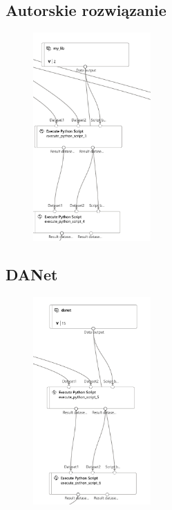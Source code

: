 \subsection{Autorskie rozwiązanie}
\begin{figure}[H]
    \centering
    \includegraphics[width=0.4\textwidth]{images/ga_pipe}
    \label{fig:ga-pipe}
\end{figure}

\subsection{DANet}
\begin{figure}[H]
    \centering
    \includegraphics[width=0.4\textwidth]{images/danet}
    \label{fig:danet-pipe}
\end{figure}




